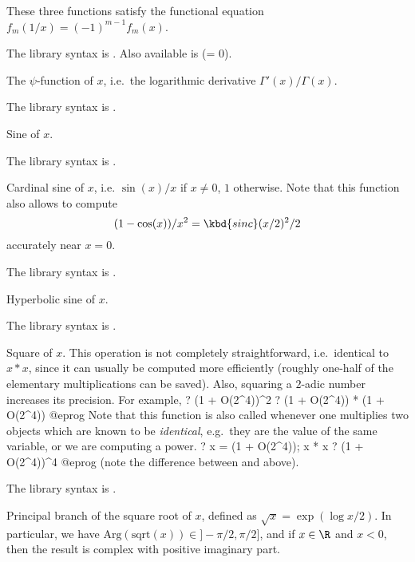 These three functions satisfy the functional equation
$f_m(1/x) = (-1)^{m-1}f_m(x)$.

The library syntax is .
Also available is
 (\fl = 0).

\label{se:psi}
The $\psi$-function of $x$, i.e.~the logarithmic derivative
$\Gamma'(x)/\Gamma(x)$.

The library syntax is .

\label{se:sin}
Sine of $x$.

The library syntax is .

\label{se:sinc}
Cardinal sine of $x$, i.e. $\sin(x)/x$ if $x\neq 0$, $1$ otherwise.
Note that this function also allows to compute
$$(1-\cos(x)) / x^2 = \kbd{sinc}(x/2)^2 / 2$$
accurately near $x = 0$.

The library syntax is .

\label{se:sinh}
Hyperbolic sine of $x$.

The library syntax is .

\label{se:sqr}
Square of $x$. This operation is not completely
straightforward, i.e.~identical to $x * x$, since it can usually be
computed more efficiently (roughly one-half of the elementary
multiplications can be saved). Also, squaring a $2$-adic number increases
its precision. For example,
\bprog
? (1 + O(2^4))^2
? (1 + O(2^4)) * (1 + O(2^4))
@eprog\noindent
Note that this function is also called whenever one multiplies two objects
which are known to be \emph{identical}, e.g.~they are the value of the same
variable, or we are computing a power.
\bprog
? x = (1 + O(2^4)); x * x
? (1 + O(2^4))^4
@eprog\noindent
(note the difference between  and  above).

The library syntax is .

\label{se:sqrt}
Principal branch of the square root of $x$, defined as $\sqrt{x} =
\exp(\log x / 2)$. In particular, we have
$\text{Arg}(\text{sqrt}(x))\in{} ]-\pi/2, \pi/2]$, and if $x\in \R$ and $x<0$,
then the result is complex with positive imaginary part.

